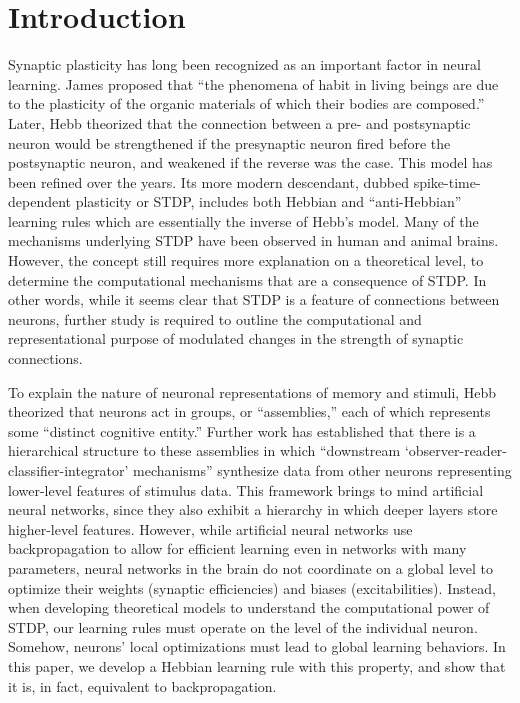 \documentclass[12pt]{article}
\begin{document}
\section{Introduction}
Synaptic plasticity has long been recognized as an important factor in neural learning. James \cite{James1890} proposed that ``the phenomena of habit in living beings are due to the plasticity of the organic materials of which their bodies are composed.'' Later, Hebb \cite{Hebb1949} theorized that the connection between a pre- and postsynaptic neuron would be strengthened if the presynaptic neuron fired before the postsynaptic neuron, and weakened if the reverse was the case. This model has been refined over the years. \cite{Markram2012} Its more modern descendant, dubbed spike-time-dependent plasticity or STDP, includes both Hebbian and ``anti-Hebbian'' learning rules which are essentially the inverse of Hebb's model. \cite{Carlson1990} Many of the mechanisms underlying STDP have been observed in human and animal brains. \cite{Markram2011} However, the concept still requires more explanation on a theoretical level, to determine the computational mechanisms that are a consequence of STDP. In other words, while it seems clear that STDP is a feature of connections between neurons, further study is required to outline the computational and representational purpose of modulated changes in the strength of synaptic connections.

To explain the nature of neuronal representations of memory and stimuli, Hebb theorized that neurons act in groups, or ``assemblies,'' each of which represents some ``distinct cognitive entity.'' \cite{Hebb1949} Further work has established that there is a hierarchical structure to these assemblies in which ``downstream `observer-reader-classifier-integrator' mechanisms'' synthesize data from other neurons representing lower-level features of stimulus data. \cite{Buzsaki2010} This framework brings to mind artificial neural networks, since they also exhibit a hierarchy in which deeper layers store higher-level features. \cite{HighLevelFeaturesANN} However, while artificial neural networks use backpropagation to allow for efficient learning even in networks with many parameters, \cite{backprop} neural networks in the brain do not coordinate on a global level to optimize their weights (synaptic efficiencies) and biases (excitabilities). \cite{Dahmen2022} Instead, when developing theoretical models to understand the computational power of STDP, our learning rules must operate on the level of the individual neuron. Somehow, neurons' local optimizations must lead to global learning behaviors. In this paper, we develop a Hebbian learning rule with this property, and show that it is, in fact, equivalent to backpropagation.
\end{document}
